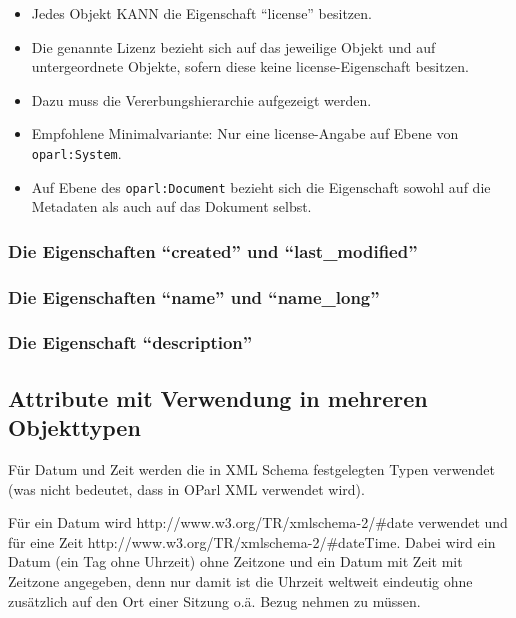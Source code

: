 \documentclass[,a4paper]{article}
\begin{document}
\begin{itemize}
\itemsep1pt\parskip0pt
\item
  Jedes Objekt KANN die Eigenschaft ``license'' besitzen.
\item
  Die genannte Lizenz bezieht sich auf das jeweilige Objekt und auf
  untergeordnete Objekte, sofern diese keine license-Eigenschaft
  besitzen.
\item
  Dazu muss die Vererbungshierarchie aufgezeigt werden.
\item
  Empfohlene Minimalvariante: Nur eine license-Angabe auf Ebene von
  \texttt{oparl:System}.
\item
  Auf Ebene des \texttt{oparl:Document} bezieht sich die Eigenschaft
  sowohl auf die Metadaten als auch auf das Dokument selbst.
\end{itemize}

\subsubsection{Die Eigenschaften ``created'' und
``last\_modified''}\label{die-eigenschaften-created-und-lastux5fmodified}

\subsubsection{Die Eigenschaften ``name'' und
``name\_long''}\label{die-eigenschaften-name-und-nameux5flong}

\subsubsection{Die Eigenschaft
``description''}\label{die-eigenschaft-description}

\subsection{Attribute mit Verwendung in mehreren
Objekttypen}\label{attribute-mit-verwendung-in-mehreren-objekttypen}

Für Datum und Zeit werden die in XML Schema festgelegten Typen verwendet
(was nicht bedeutet, dass in OParl XML verwendet wird).

Für ein Datum wird http://www.w3.org/TR/xmlschema-2/\#date verwendet und
für eine Zeit http://www.w3.org/TR/xmlschema-2/\#dateTime. Dabei wird
ein Datum (ein Tag ohne Uhrzeit) ohne Zeitzone und ein Datum mit Zeit
mit Zeitzone angegeben, denn nur damit ist die Uhrzeit weltweit
eindeutig ohne zusätzlich auf den Ort einer Sitzung o.ä. Bezug nehmen zu
müssen.
\end{document}
